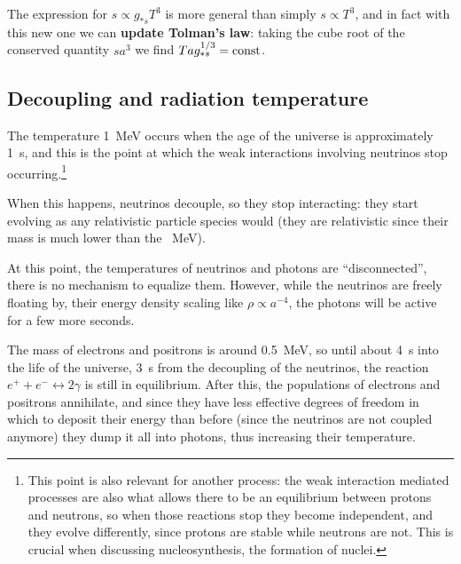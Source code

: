 \documentclass[main.tex]{subfiles}
\begin{document}
The expression for \(s \propto g_{*s} T^3\) is more general than simply \(s \propto T^3\), and in fact with this new one we can \textbf{update Tolman's law}: taking the cube root of the conserved quantity \(s a^3\) we find \(T a g_{* s }^{1/3} = \text{const}\).


\subsection{Decoupling and radiation temperature}

The temperature \SI{1}{MeV} occurs when the age of the universe is approximately \SI{1}{s}, and this is the point at which the weak interactions involving neutrinos stop occurring.\footnote{This point is also relevant for another process: the weak interaction mediated processes are also what allows there to be an equilibrium between protons and neutrons, so when those reactions stop they become independent, and they evolve differently, since protons are stable while neutrons are not. This is crucial when discussing nucleosynthesis, the formation of nuclei.}


When this happens, neutrinos decouple, so they stop interacting: they start evolving as any relativistic particle species would (they are relativistic since their mass is much lower than the \SI{}{MeV}).

At this point, the temperatures of neutrinos and photons are ``disconnected'', there is no mechanism to equalize them.
However, while the neutrinos are freely floating by, their energy density scaling like \(\rho \propto a^{-4}\), the photons will be active for a few more seconds. 

The mass of electrons and positrons is around \SI{0.5}{MeV}, so until about \SI{4}{s} into the life of the universe, \SI{3}{s} from the decoupling of the neutrinos, the reaction \(e^{+} + e^{-} \leftrightarrow 2 \gamma \) is still in equilibrium. 
After this, the populations of electrons and positrons annihilate, and since they have less effective degrees of freedom in which to deposit their energy than before (since the neutrinos are not coupled anymore) they dump it all into photons, thus increasing their temperature. 
\end{document}
